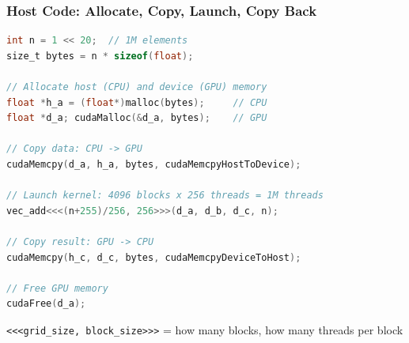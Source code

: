 \documentclass[aspectratio=169]{beamer}
\begin{document}
\begin{frame}[fragile]
	\frametitle{Host Code: Allocate, Copy, Launch, Copy Back}
	\begin{lstlisting}[language=C]
int n = 1 << 20;  // 1M elements
size_t bytes = n * sizeof(float);

// Allocate host (CPU) and device (GPU) memory
float *h_a = (float*)malloc(bytes);     // CPU
float *d_a; cudaMalloc(&d_a, bytes);    // GPU

// Copy data: CPU -> GPU
cudaMemcpy(d_a, h_a, bytes, cudaMemcpyHostToDevice);

// Launch kernel: 4096 blocks x 256 threads = 1M threads
vec_add<<<(n+255)/256, 256>>>(d_a, d_b, d_c, n);

// Copy result: GPU -> CPU
cudaMemcpy(h_c, d_c, bytes, cudaMemcpyDeviceToHost);

// Free GPU memory
cudaFree(d_a);
	\end{lstlisting}
	\vspace{0.3em}
	\begin{center}
		\texttt{<<<grid\_size, block\_size>>>} = how many blocks, how many threads per block
	\end{center}
\end{frame}
\end{document}
